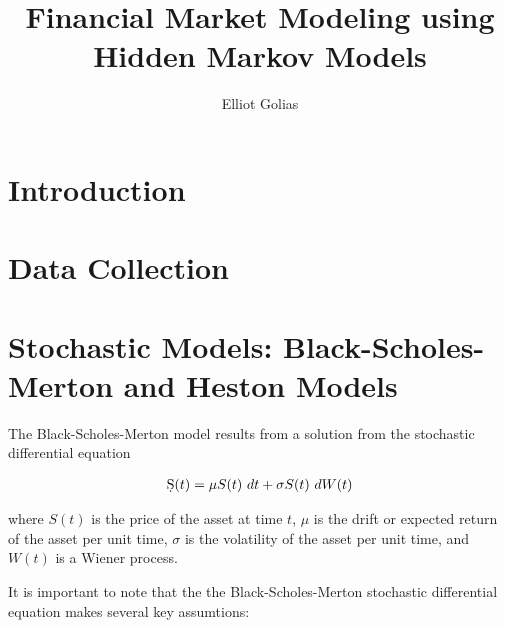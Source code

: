 \documentclass[a4paper,11pt]{article}
\title{Financial Market Modeling using Hidden Markov Models}
\author{Elliot Golias}
\begin{document}
 
\maketitle
\flushbottom

\section{Introduction}
\label{sec:intro}

\section{Data Collection}
\label{sec:data_collection}

\section{Stochastic Models: Black-Scholes-Merton and Heston Models}
\label{sec:models}

The Black-Scholes-Merton model results from a solution from the stochastic differential equation

\begin{align}
  \label{eq:BSM-SDE}
  \d S(t) = \mu S(t) \ d t + \sigma S(t) \ d W(t)
\end{align}

where $S(t)$ is the price of the asset at time $t$, $\mu$ is the drift or expected return of the asset per unit time,
$\sigma$ is the volatility of the asset per unit time, and $W(t)$ is a Wiener process.

It is important to note that the the Black-Scholes-Merton stochastic differential equation
makes several key assumtions:
\end{document}
